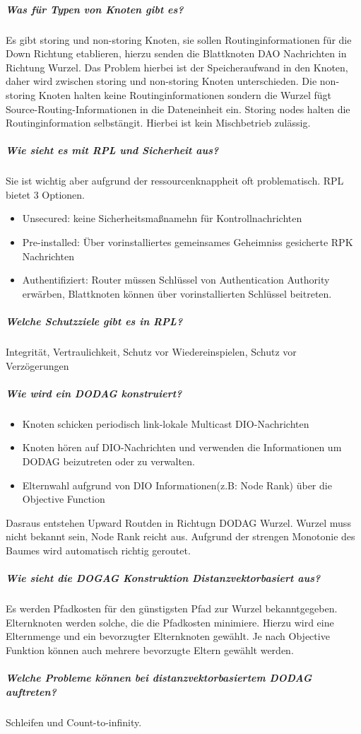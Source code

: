 	\subparagraph{Was für Typen von Knoten gibt es?}
	Es gibt storing und non-storing Knoten, sie sollen Routinginformationen für die Down Richtung etablieren, hierzu senden die Blattknoten DAO Nachrichten in Richtung Wurzel. Das Problem hierbei ist der Speicheraufwand in den Knoten, daher wird zwischen storing und non-storing Knoten unterschieden. Die non-storing Knoten halten keine Routinginformationen sondern die Wurzel fügt Source-Routing-Informationen in die Dateneinheit ein. Storing nodes halten die Routinginformation selbstängit. Hierbei ist kein Mischbetrieb zulässig.
	
	\subparagraph{Wie sieht es mit RPL und Sicherheit aus?}
	Sie ist wichtig aber aufgrund der ressourcenknappheit oft problematisch. RPL bietet 3 Optionen.
	\begin{itemize}
		\item Unsecured: keine Sicherheitsmaßnamehn für Kontrollnachrichten
		\item Pre-installed: Über vorinstalliertes gemeinsames Geheimniss gesicherte RPK Nachrichten
		\item Authentifiziert: Router müssen Schlüssel von Authentication Authority erwärben, Blattknoten können über vorinstallierten Schlüssel beitreten.
	\end{itemize}
	
	\subparagraph{Welche Schutzziele gibt es in RPL?}
	Integrität, Vertraulichkeit, Schutz vor Wiedereinspielen, Schutz vor Verzögerungen
	
	\subparagraph{Wie wird ein DODAG konstruiert?}
	\begin{itemize}
		\item Knoten schicken periodisch link-lokale Multicast DIO-Nachrichten
		\item Knoten hören auf DIO-Nachrichten und verwenden die Informationen um DODAG beizutreten oder zu verwalten.
		\item Elternwahl aufgrund von DIO Informationen(z.B: Node Rank) über die Objective Function
	\end{itemize}
	Dasraus entstehen Upward Routden in Richtugn DODAG Wurzel. Wurzel muss nicht bekannt sein, Node Rank reicht aus. Aufgrund der strengen Monotonie des Baumes wird automatisch richtig geroutet.
	
	\subparagraph{Wie sieht die DOGAG Konstruktion Distanzvektorbasiert aus?}
	Es werden Pfadkosten für den günstigsten Pfad zur Wurzel bekanntgegeben. Elternknoten werden solche, die die Pfadkosten minimiere. Hierzu wird eine Elternmenge und ein bevorzugter Elternknoten gewählt. Je nach Objective Funktion können auch mehrere bevorzugte Eltern gewählt werden.
	\subparagraph{Welche Probleme können bei distanzvektorbasiertem DODAG auftreten?}
	Schleifen und Count-to-infinity.
	
